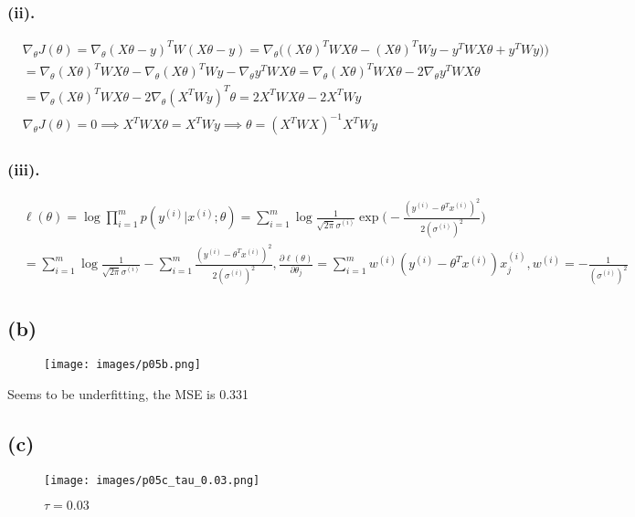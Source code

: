 \documentclass{article}
\begin{document}
\subsubsection*{(ii).}
\begin{align*}
    & \nabla_{\theta}J(\theta)=\nabla_{\theta}(X\theta-y)^{T}W(X\theta-y)=\nabla_{\theta}\Big((X\theta)^{T}WX\theta-(X\theta)^{T}Wy-y^{T}WX\theta+y^{T}Wy)\Big)            \\
    & =\nabla_{\theta}(X\theta)^{T}WX\theta-\nabla_{\theta}(X\theta)^{T}Wy-\nabla_{\theta}y^{T}WX\theta=\nabla_{\theta}(X\theta)^{T}WX\theta-2\nabla_{\theta}y^{T}WX\theta \\
    & =\nabla_{\theta}(X\theta)^{T}WX\theta-2\nabla_{\theta}(X^{T}Wy)^{T}\theta=2X^{T}WX\theta-2X^{T}Wy                                                                    \\
    & \nabla_{\theta}J(\theta)=0\implies X^{T}WX\theta=X^{T}Wy\implies\theta=(X^{T}WX)^{-1}X^{T}Wy
\end{align*}

\subsubsection*{(iii).}
\begin{align*}
    & \ell(\theta)=\log\prod_{i=1}^{m}p(y^{(i)}|x^{(i)};\theta)=\sum_{i=1}^{m}\log\frac{1}{\sqrt{2\pi}\sigma^{(i)}}\exp\Big(-\frac{(y^{(i)}-\theta^{T}x^{(i)})^{2}}{2(\sigma^{(i)})^{2}}\Big)                                                                                          \\
    & =\sum_{i=1}^{m}\log\frac{1}{\sqrt{2\pi}\sigma^{(i)}}-\sum_{i=1}^{m}\frac{(y^{(i)}-\theta^{T}x^{(i)})^{2}}{2(\sigma^{(i)})^{2}},\frac{\partial\ell(\theta)}{\partial\theta_{j}}=\sum_{i=1}^{m}w^{(i)}(y^{(i)}-\theta^{T}x^{(i)})x_{j}^{(i)},w^{(i)}=-\frac{1}{(\sigma^{(i)})^{2}}
\end{align*}

\newpage

\subsection*{(b)}
\begin{figure}[h]
  \centering
  \texttt{[image: images/p05b.png]}
\end{figure}
Seems to be underfitting, the MSE is 0.331

\subsection*{(c)}
\begin{figure}
  \centering
  \texttt{[image: images/p05c\_tau\_0.03.png]}
  \caption{$\tau=0.03$}
  \label{fig:enter-label}
\end{figure}
\end{document}
